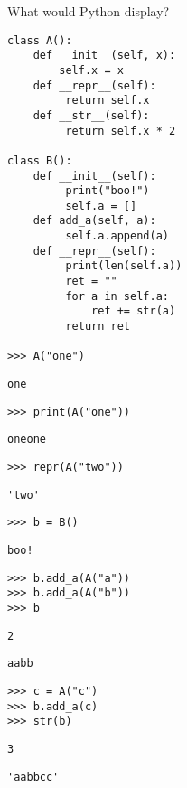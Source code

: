 \question What would Python display?

\begin{lstlisting}
class A():
    def __init__(self, x):
        self.x = x
    def __repr__(self):
         return self.x
    def __str__(self):
         return self.x * 2

class B():
    def __init__(self):
         print("boo!")
         self.a = []
    def add_a(self, a):
         self.a.append(a)
    def __repr__(self):
         print(len(self.a))
         ret = ""
         for a in self.a:
             ret += str(a)
         return ret

>>> A("one")
\end{lstlisting}
\begin{solution}[0.25in]
\lstinline{one}
\end{solution}

\begin{lstlisting}
>>> print(A("one"))
\end{lstlisting}
\begin{solution}[0.25in]
\lstinline{oneone}
\end{solution}

\begin{lstlisting}
>>> repr(A("two"))
\end{lstlisting}
\begin{solution}[0.25in]
\lstinline{'two'}
\end{solution}

\begin{lstlisting}
>>> b = B()
\end{lstlisting}
\begin{solution}[0.25in]
\lstinline{boo!}
\end{solution}

\begin{lstlisting}
>>> b.add_a(A("a"))
>>> b.add_a(A("b"))
>>> b
\end{lstlisting}
\begin{solution}[0.25in]
\lstinline{2}
\end{solution}
\begin{solution}[0.25in]
\lstinline{aabb}
\end{solution}
\begin{lstlisting}
>>> c = A("c")
>>> b.add_a(c)
>>> str(b)
\end{lstlisting}
\begin{solution}[0.25in]
\lstinline{3}
\end{solution}
\begin{solution}[0.25in]
\lstinline{'aabbcc'}
\end{solution}
